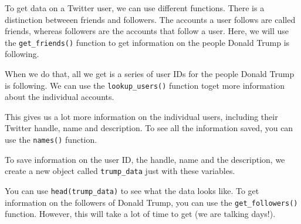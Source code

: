 \documentclass[12pt,oneside]{reedthesis}
\theoremstyle{definition}
\theoremstyle{definition}
\theoremstyle{definition}
\theoremstyle{remark}
\begin{document}
  To get data on a Twitter user, we can use different functions. There is
  a distinction betweeen friends and followers. The accounts a user
  follows are called friends, whereas followers are the accounts that
  follow a user. Here, we will use the \texttt{get\_friends()} function to
  get information on the people Donald Trump is following.
  \begin{Shaded}
  \begin{Highlighting}[]
  \StringTok{ }\NormalTok{(}\NormalTok{)}
  \end{Highlighting}
  \end{Shaded}
  When we do that, all we get is a series of user IDs for the people
  Donald Trump is following. We can use the \texttt{lookup\_users()}
  function toget more information about the individual accounts.
  \begin{Shaded}
  \begin{Highlighting}[]
  \StringTok{ }\OperatorTok{$}
  \end{Highlighting}
  \end{Shaded}
  This gives us a lot more information on the individual users, including
  their Twitter handle, name and description. To see all the information
  saved, you can use the \texttt{names()} function.
  \begin{Shaded}
  \begin{Highlighting}[]
  \end{Highlighting}
  \end{Shaded}
  To save information on the user ID, the handle, name and the
  description, we create a new object called \texttt{trump\_data} just
  with these variables.
  \begin{Shaded}
  \end{Shaded}
  You can use \texttt{head(trump\_data)} to see what the data looks like.
  To get information on the followers of Donald Trump, you can use the
  \texttt{get\_followers()} function. However, this will take a lot of
  time to get (we are talking days!).
  
\end{document}
